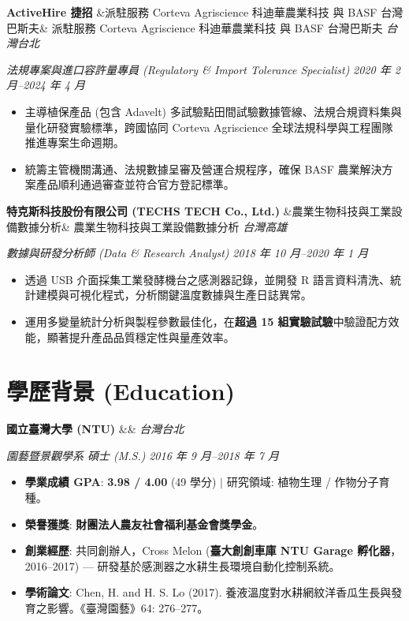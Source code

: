 \documentclass[10pt,a4paper]{article}
\newcommand{\entryheader}[3]{%
  \noindent%
  \textbf{\color{maindark}#1}%
  \ifx&#2&%
  \else%
    { \small\color{subgray}#2}%
  \fi%
  \hfill%
  \textit{\color{locationcoral}#3}\par%
}
\newcommand{\entrysubheader}[2]{%
  \noindent%
  \textit{\color{subgray}#1}%
  \hfill%
  \textit{\color{subgray}#2}\par%
  \vspace{1.5pt}%
}
\begin{document}
\vspace{3pt}

\entryheader{ActiveHire 捷招}{派駐服務 Corteva Agriscience 科迪華農業科技 與 BASF 台灣巴斯夫}{台灣台北}
\entrysubheader{法規專案與進口容許量專員 (Regulatory \& Import Tolerance Specialist)}{2020 年 2 月--2024 年 4 月}
\begin{itemize}
    \item {主導植保產品 (包含 Adavelt\texttrademark{}) 多試驗點田間試驗數據管線、法規合規資料集與量化研發實驗標準，跨國協同 Corteva Agriscience 全球法規科學與工程團隊推進專案生命週期。}
    \item {統籌主管機關溝通、法規數據呈審及營運合規程序，確保 BASF 農業解決方案產品順利通過審查並符合官方登記標準。}
\end{itemize}

\vspace{3pt}

\entryheader{特克斯科技股份有限公司 (TECHS TECH Co., Ltd.)}{農業生物科技與工業設備數據分析}{台灣高雄}
\entrysubheader{數據與研發分析師 (Data \& Research Analyst)}{2018 年 10 月--2020 年 1 月}
\begin{itemize}
    \item {透過 USB 介面採集工業發酵機台之感測器記錄，並開發 R 語言資料清洗、統計建模與可視化程式，分析關鍵溫度數據與生產日誌異常。}
    \item {運用多變量統計分析與製程參數最佳化，在\textbf{超過 15 組實驗試驗}中驗證配方效能，顯著提升產品品質穩定性與量產效率。}
\end{itemize}

\section{學歷背景 (Education)}

\entryheader{國立臺灣大學 (NTU)}{}{台灣台北}
\entrysubheader{園藝暨景觀學系 碩士 (M.S.)}{2016 年 9 月--2018 年 7 月}
\begin{itemize}
    \item \textbf{學業成績 GPA}: \textbf{3.98 / 4.00} (49 學分) $|$ 研究領域: 植物生理 / 作物分子育種。
    \item \textbf{榮譽獲獎}: \textbf{財團法人農友社會福利基金會獎學金}。
    \item \textbf{創業經歷}: 共同創辦人，Cross Melon (\textbf{臺大創創車庫 NTU Garage 孵化器}，2016--2017) --- 研發基於感測器之水耕生長環境自動化控制系統。
    \item \textbf{學術論文}: Chen, H. and H. S. Lo (2017). 養液溫度對水耕網紋洋香瓜生長與發育之影響。《臺灣園藝》64: 276--277。
\end{itemize}
\end{document}
